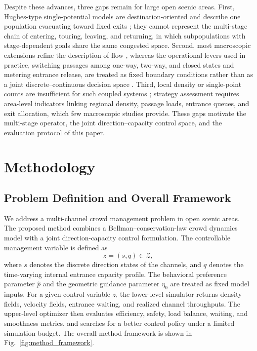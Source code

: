 \documentclass[lettersize,journal]{IEEEtran}
\begin{document}
Despite these advances, three gaps remain for large open scenic areas.
First, Hughes-type single-potential models are destination-oriented and describe one population evacuating toward fixed exits \cite{hughes2003,RN2078}; they cannot represent the multi-stage chain of entering, touring, leaving, and returning, in which subpopulations with stage-dependent goals share the same congested space.
Second, most macroscopic extensions refine the description of flow \cite{RN2097,RN2099,RN2104}, whereas the operational levers used in practice, switching passages among one-way, two-way, and closed states and metering entrance release, are treated as fixed boundary conditions rather than as a joint discrete--continuous decision space \cite{RN2118,RN2122}.
Third, local density or single-point counts are insufficient for such coupled systems \cite{RN2124}; strategy assessment requires area-level indicators linking regional density, passage loads, entrance queues, and exit allocation, which few macroscopic studies provide.
These gaps motivate the multi-stage operator, the joint direction--capacity control space, and the evaluation protocol of this paper.

\section{Methodology}
\label{sec:model}

\subsection{Problem Definition and Overall Framework}

We address a multi-channel crowd management problem in open scenic areas.
The proposed method combines a Bellman--conservation-law crowd dynamics model \cite{hughes2003,RN2078} with a joint direction-capacity control formulation.
The controllable management variable is defined as
\begin{equation}
z=(s,q)\in\mathcal Z,
\label{eq:control_variable}
\end{equation}
where $s$ denotes the discrete direction states of the channels, and $q$ denotes the time-varying internal entrance capacity profile.
The behavioral preference parameter $\hat p$ and the geometric guidance parameter $\eta_0$ are treated as fixed model inputs.
For a given control variable $z$, the lower-level simulator returns density fields, velocity fields, entrance waiting, and realized channel throughputs.
The upper-level optimizer then evaluates efficiency, safety, load balance, waiting, and smoothness metrics, and searches for a better control policy under a limited simulation budget.
The overall method framework is shown in Fig.~\ref{fig:method_framework}.
\end{document}
